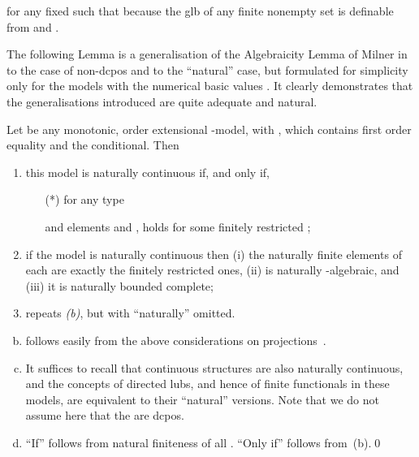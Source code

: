 \documentclass[fleqn]{LMCS}
\theoremstyle{plain}\newtheorem{satz}[thm]{Satz}
\theoremstyle{plain}\newtheorem{hyp}[thm]{Hypothesis}
\theoremstyle{plain}\newtheorem{hyps}[thm]{Hypotheses}
\theoremstyle{definition}\newtheorem{note}[thm]{Note}
\newcommand{\?}{\mbox{?}}
\begin{document}
for any fixed  such that  
because the glb of any finite nonempty set is definable from  and . 


The following Lemma is a generalisation of the Algebraicity Lemma of Milner 
in \cite{Milner77} to the case of non-dcpos and to the ``natural'' case, 
but formulated for simplicity only for the models with the numerical basic values 
. 
It clearly demonstrates that the generalisations introduced are 
quite adequate and natural. 


\begin{lem}\label{lemma:algebraicity} 
Let  be any monotonic, order extensional 
-model, with , 
which contains first order equality and the conditional. Then
\begin{enumerate}[\em(a)]
\item this model is naturally continuous 
if, and only if, 
   \begin{itemize}
   \item[(*)] for any type 
 
and elements 
 and , 
 holds 
for some finitely restricted 
; 
   \end{itemize}

\item if the model is naturally continuous 
then 
(i) the naturally finite elements of each  
are exactly the finitely restricted ones, 
(ii)  
is naturally -algebraic, and 
(iii) it is 
naturally bounded complete;  

\item repeats {\em(b)}, but with ``naturally'' omitted. 
\end{enumerate}
\end{lem}
\proof\hfill
\begin{enumerate}[(a)]
\setcounter{enumi}{1}
\item \label{page:algebraicity}
follows easily from the above considerations on projections~. 

\item It suffices to recall that continuous structures 
are also naturally continuous, and 
the concepts of directed lubs, and hence of finite functionals 
in these models, are equivalent to their 
``natural'' versions. 
Note that we do not assume here that the  are dcpos. 

\setcounter{enumi}{0}
\item ``If'' follows from natural  finiteness of all . 
``Only if'' follows from~(b).\qed
\end{enumerate}
\end{document}
